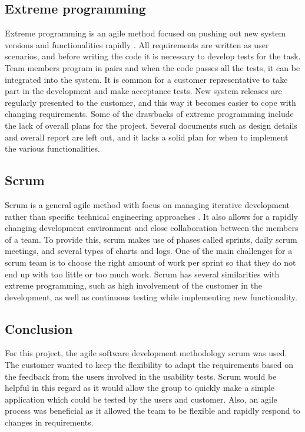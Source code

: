 \subsection{Extreme programming}
Extreme programming is an agile method focused on pushing out new system versions and functionalities rapidly \cite[p.64-72]{Sommerville}. All requirements are written as user scenarios, and before writing the code it is necessary to develop tests for the task. Team members program  in pairs and when the code passes all the tests, it can be integrated into the system.  It is common for a customer representative to take part in the development and make acceptance tests. New system releases are regularly presented to the customer, and this way it becomes easier to cope with changing requirements. Some of the drawbacks of extreme programming include the lack of overall plans for the project. Several documents such as design details and overall report are left out, and it lacks a solid plan for when to implement the various functionalities.


\subsection{Scrum }
\label{sec:scrum}
Scrum is a general agile method with focus on managing iterative development rather than specific technical engineering approaches \cite[p.72-74]{Sommerville}. It also allows for a rapidly changing development environment and close collaboration between the members of a team. To provide this, scrum makes use of phases called sprints, daily scrum meetings, and several types of charts and logs. One of the main challenges for a scrum team is to choose the right amount of work per sprint so that they do not end up with too little or too much work. Scrum has several similarities with extreme programming, such as high involvement of the customer in the development, as well as continuous testing while implementing new functionality.

\subsection{Conclusion}
For this project, the agile software development methodology scrum was used. The customer wanted to keep the flexibility to adapt the requirements based on the feedback from the users involved in the usability tests. Scrum would be helpful in this regard as it would allow the group to quickly make a simple application which could be tested by the users and customer. Also, an agile process was beneficial as it allowed the team to be flexible and rapidly respond to changes in requirements. 


